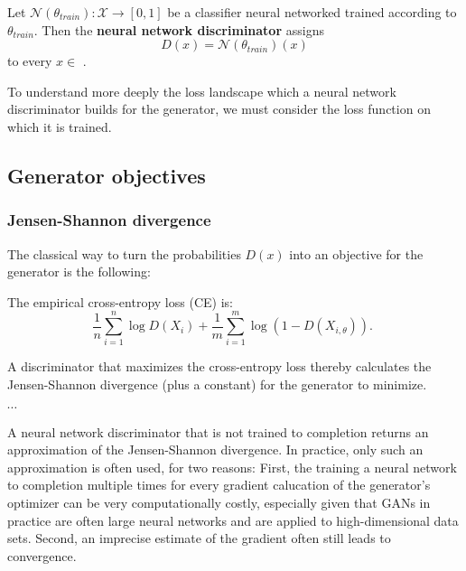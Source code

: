 \begin{definition}
    Let $\mathcal{N}(\theta_{train}): \mathcal{X} \rightarrow [0, 1]$ be a classifier neural networked trained according to $\theta_{train}$.
    Then the \textbf{neural network discriminator} assigns
    \begin{equation}
        D(x) = \mathcal{N}(\theta_{train})(x)
    \end{equation}
    to every $x \in$ . %
\end{definition}

To understand more deeply the loss landscape which a neural network discriminator builds for the generator, we must consider the loss function on which it is trained.

\subsection{Generator objectives}
\label{sec:losses}

\subsubsection{Jensen-Shannon divergence}
\label{sec:ce_loss}

The classical way to turn the probabilities $D(x)$ into an objective for the generator is the following: 

\begin{definition}[Cross-entropy loss] %
    The empirical cross-entropy loss (CE) is:
    $$
    \frac{1}{n} \sum_{i=1}^n \log D\left(X_i\right)+\frac{1}{m} \sum_{i=1}^m \log \left(1-D\left(X_{i, \theta}\right)\right) \text {. }
    $$    
\end{definition}

A discriminator that maximizes the cross-entropy loss thereby calculates the Jensen-Shannon divergence (plus a constant) for the generator to minimize.
\begin{theorem}
    $\cdots$
\end{theorem}
A neural network discriminator that is not trained to completion returns an approximation of the Jensen-Shannon divergence.
In practice, only such an approximation is often used, for two reasons:
First, the training a neural network to completion multiple times for every gradient calucation of the generator's optimizer can be very computationally costly, %
especially given that GANs in practice are often large neural networks and are applied to high-dimensional data sets.
Second, an imprecise estimate of the gradient often still leads to convergence. %

